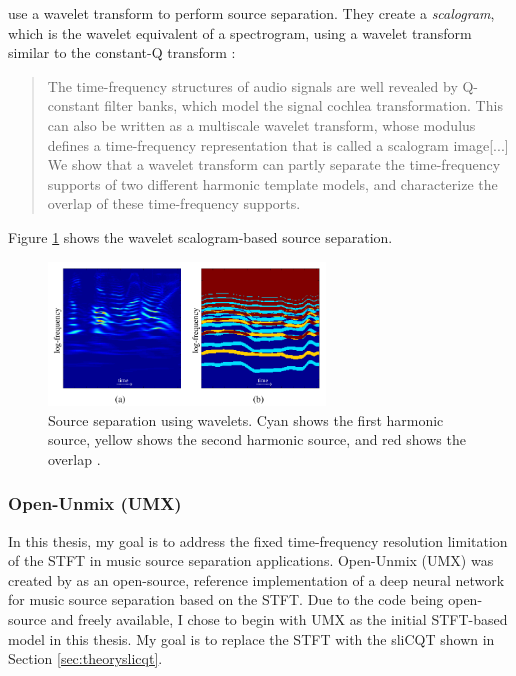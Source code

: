 \documentclass[report.tex]{subfiles}
\begin{document}
\textcite{wavelets} use a wavelet transform to perform source separation. They create a \textit{scalogram}, which is the wavelet equivalent of a spectrogram, using a wavelet transform similar to the constant-Q transform \parencite[2--3]{wavelets}:

\begin{quote}
       The time-frequency structures of audio signals are well revealed by Q-constant filter banks, which model the signal cochlea transformation. This can also be written as a multiscale wavelet transform, whose modulus defines a time-frequency representation that is called a scalogram image[...] We show that a wavelet transform can partly separate the time-frequency supports of two different harmonic template models, and characterize the overlap of these time-frequency supports.
\end{quote}

Figure \ref{fig:waveletsep} shows the wavelet scalogram-based source separation.

\begin{figure}[ht]
       \centering
       \includegraphics[width=0.65635\textwidth]{./images-wavelets/wavelet_sep.png}
       \caption{Source separation using wavelets. Cyan shows the first harmonic source, yellow shows the second harmonic source, and red shows the overlap \parencite[5]{wavelets}.}
       \label{fig:waveletsep}
\end{figure}

\subsubsection{Open-Unmix (UMX)}
\label{sec:umx}

In this thesis, my goal is to address the fixed time-frequency resolution limitation of the STFT in music source separation applications. Open-Unmix (UMX) was created by \textcite{umx} as an open-source, reference implementation of a deep neural network for music source separation based on the STFT. Due to the code being open-source and freely available, I chose to begin with UMX as the initial STFT-based model in this thesis. My goal is to replace the STFT with the sliCQT shown in Section \ref{sec:theoryslicqt}.
\end{document}
